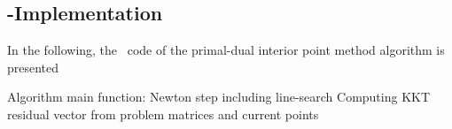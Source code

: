 \subsection{\matlab-Implementation}
In the following, the \matlab \ code of the primal-dual interior point method algorithm is presented

Algorithm main function:
{\tiny }
Newton step including line-search
{\tiny }
Computing KKT residual vector from problem matrices and current points
{\tiny }

